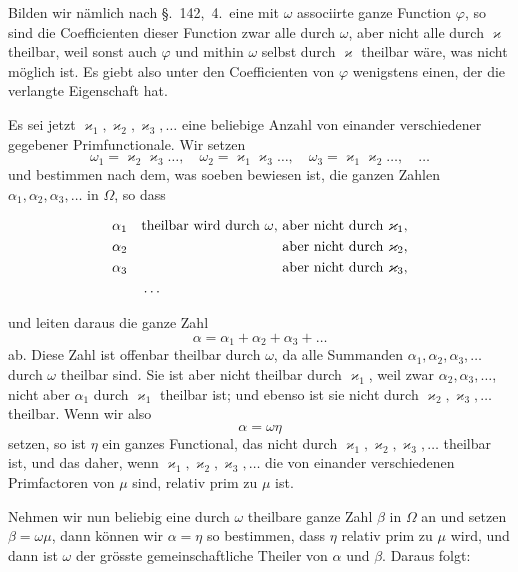 \documentclass[12pt,a4paper]{article}
\theoremstyle{definition}
\begin{document}
Bilden wir nämlich nach \S.~142,~4.\ eine mit $\omega$ associirte ganze Function $\varphi$, so sind die Coefficienten dieser Function zwar alle durch $\omega$, aber nicht alle durch $\varkappa$ theilbar, weil sonst auch $\varphi$ und mithin $\omega$ selbst durch $\varkappa$ theilbar wäre, was nicht möglich ist. Es giebt also unter den Coefficienten von $\varphi$ wenigstens einen, der die verlangte Eigenschaft hat.

\newpage

Es sei jetzt $\varkappa_1,\varkappa_2,\varkappa_3,\dots$ eine beliebige Anzahl von einander verschiedener gegebener Primfunctionale. Wir setzen
\[
\omega_1 = \varkappa_2\varkappa_3\dots,\quad
\omega_2 = \varkappa_1\varkappa_3\dots,\quad
\omega_3 = \varkappa_1\varkappa_2\dots,\quad \dots
\]
und bestimmen nach dem, was soeben bewiesen ist, die ganzen Zahlen $\alpha_1,\alpha_2,\alpha_3,\dots$ in $\Omega$, so dass

\begin{align*}
\alpha_1 &\quad\text{theilbar wird durch $\omega$, aber nicht durch $\varkappa_1$},\\
\alpha_2 &\quad\text{\hphantom{theilbar wird durch $\omega$,} aber nicht durch $\varkappa_2$},\\
\alpha_3 &\quad\text{\hphantom{theilbar wird durch $\omega$,} aber nicht durch $\varkappa_3$},\\
&\quad\dots
\end{align*}

und leiten daraus die ganze Zahl
\[
\alpha = \alpha_1 + \alpha_2 + \alpha_3 + \dots
\]
ab. Diese Zahl ist offenbar theilbar durch $\omega$, da alle Summanden $\alpha_1,\alpha_2,\alpha_3,\dots$ durch $\omega$ theilbar sind. Sie ist aber nicht theilbar durch $\varkappa_1$, weil zwar $\alpha_2,\alpha_3,\dots$, nicht aber $\alpha_1$ durch $\varkappa_1$ theilbar ist; und ebenso ist sie nicht durch $\varkappa_2,\varkappa_3,\dots$ theilbar. Wenn wir also
\[
\alpha = \omega\eta
\]
setzen, so ist $\eta$ ein ganzes Functional, das nicht durch $\varkappa_1,\varkappa_2,\varkappa_3,\dots$ theilbar ist, und das daher, wenn $\varkappa_1,\varkappa_2,\varkappa_3,\dots$ die von einander verschiedenen Primfactoren von $\mu$ sind, relativ prim zu $\mu$ ist.

Nehmen wir nun beliebig eine durch $\omega$ theilbare ganze Zahl $\beta$ in $\Omega$ an und setzen $\beta=\omega\mu$, dann können wir $\alpha=\eta$ so bestimmen, dass $\eta$ relativ prim zu $\mu$ wird, und dann ist $\omega$ der grösste gemeinschaftliche Theiler von $\alpha$ und $\beta$. Daraus folgt:
\end{document}
